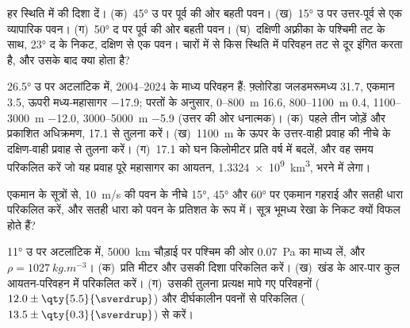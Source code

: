 \begin{exercise}[$\star$]\label{exo:b1:ocean-circulation:2}
हर स्थिति में  की दिशा दें। (क)~\ang{45} उ पर पूर्व की ओर बहती पवन। (ख)~\ang{15} उ पर उत्तर-पूर्व से एक व्यापारिक पवन।
(ग)~\ang{50} द पर पूर्व की ओर बहती पवन। (घ)~दक्षिणी अफ़्रीका के पश्चिमी तट के साथ, \ang{23} द के निकट, दक्षिण से एक पवन। चारों में से किस स्थिति में परिवहन तट से दूर इंगित करता है, और उसके बाद क्या होता है?
\end{exercise}

\begin{exercise}[$\star$]\label{exo:b1:ocean-circulation:3}
\ang{26.5} उ पर अटलांटिक में, 2004--2024 के माध्य परिवहन हैं: फ़्लोरिडा जलडमरूमध्य \qty{31.7}{\sverdrup}, एकमान \qty{3.5}{\sverdrup}, ऊपरी मध्य-महासागर \qty{-17.9}{\sverdrup}; परतों के अनुसार, 0--\qty{800}{m} \qty{16.6}{\sverdrup}, 800--\qty{1100}{m} \qty{0.4}{\sverdrup}, 1100--\qty{3000}{m} \qty{-12.0}{\sverdrup}, 3000--\qty{5000}{m} \qty{-5.9}{\sverdrup} (उत्तर की ओर धनात्मक)। (क)~पहले तीन जोड़ें और प्रकाशित अधिक्रमण, \qty{17.1}{\sverdrup} से तुलना करें। (ख)~\qty{1100}{m} के ऊपर के उत्तर-वाही प्रवाह की नीचे के दक्षिण-वाही प्रवाह से तुलना करें। (ग)~\qty{17.1}{\sverdrup} को घन किलोमीटर प्रति वर्ष में बदलें, और वह समय परिकलित करें जो यह प्रवाह पूरे महासागर का आयतन, \qty{1.3324e9}{km^3}, भरने में लेगा।
\end{exercise}

\begin{exercise}[$\star$]\label{exo:b1:ocean-circulation:4}
एकमान के सूत्रों से, \qty{10}{m/s} की पवन के नीचे \ang{15}, \ang{45} और \ang{60}  पर एकमान गहराई और सतही धारा परिकलित करें, और सतही धारा को पवन के प्रतिशत के रूप में। सूत्र भूमध्य रेखा के निकट क्यों विफल होते हैं?
\end{exercise}

\begin{exercise}[$\star\star$]\label{exo:b1:ocean-circulation:5}
\ang{11} उ पर अटलांटिक में, \qty{5000}{km} चौड़ाई पर पश्चिम की ओर \qty{0.07}{Pa} का माध्य  लें, और
$\rho = \qty{1027}{kg.m^{-3}}$।
(क)~प्रति मीटर  और उसकी दिशा परिकलित करें। (ख)~खंड के आर-पार कुल आयतन-परिवहन  में परिकलित करें। (ग)~उसकी तुलना प्रत्यक्ष मापे गए परिवहनों ($12.0 \pm \qty{5.5}{\sverdrup}$) और दीर्घकालीन पवनों से परिकलित ($13.5 \pm \qty{0.3}{\sverdrup}$) से करें।
\end{exercise}

